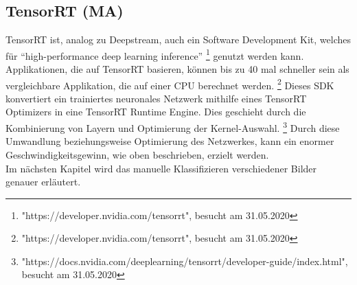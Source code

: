 \documentclass[a4paper,oneside,12pt]{report}
\begin{document}
\begin{onehalfspace}
		\subsection{TensorRT (MA)}
		TensorRT ist, analog zu Deepstream, auch ein Software Development Kit, welches für "`high-performance deep learning inference"'
		\footnote{"https://developer.nvidia.com/tensorrt", besucht am 31.05.2020} genutzt werden kann.
		Applikationen, die auf TensorRT basieren, können bis zu 40 mal schneller sein als vergleichbare Applikation, die auf einer CPU berechnet werden.
		\footnote{"https://developer.nvidia.com/tensorrt", besucht am 31.05.2020}
		Dieses SDK konvertiert ein trainiertes neuronales Netzwerk mithilfe eines TensorRT Optimizers in eine TensorRT Runtime Engine. Dies geschieht durch die Kombinierung von Layern und Optimierung der Kernel-Auswahl.
		\footnote{"https://docs.nvidia.com/deeplearning/tensorrt/developer-guide/index.html", besucht am 31.05.2020}
		Durch diese Umwandlung beziehungsweise Optimierung des Netzwerkes, kann ein enormer Geschwindigkeitsgewinn, wie oben beschrieben, erzielt werden. \\
		Im nächsten Kapitel wird das manuelle Klassifizieren verschiedener Bilder genauer erläutert.
	\end{onehalfspace}
\end{document}
